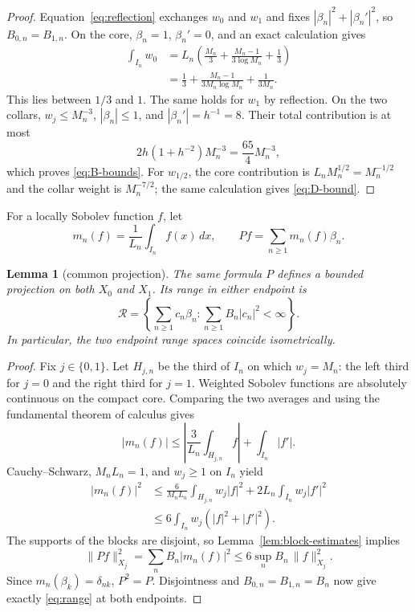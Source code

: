 \documentclass[11pt]{article}
\newtheorem{lemma}[theorem]{Lemma}
\theoremstyle{remark}
\begin{document}
\begin{proof}
Equation~\eqref{eq:reflection} exchanges $w_0$ and $w_1$ and fixes
$|\beta_n|^2+|\beta_n'|^2$, so $B_{0,n}=B_{1,n}$.  On the core,
$\beta_n=1$, $\beta_n'=0$, and an exact calculation gives
\begin{align*}
 \int_{I_n}w_0
 &=L_n\left(\frac{M_n}{3}
      +\frac{M_n-1}{3\log M_n}+\frac13\right)\\
 &=\frac13+\frac{M_n-1}{3M_n\log M_n}+\frac1{3M_n}.
\end{align*}
This lies between $1/3$ and $1$.  The same holds for $w_1$ by reflection.
On the two collars, $w_j\leq M_n^{-3}$, $|\beta_n|\leq1$, and
$|\beta_n'|=h^{-1}=8$.  Their total contribution is at most
\[
 2h(1+h^{-2})M_n^{-3}=\frac{65}{4}M_n^{-3},
\]
which proves \eqref{eq:B-bounds}.  For $w_{1/2}$, the core contribution is
$L_nM_n^{1/2}=M_n^{-1/2}$ and the collar weight is $M_n^{-7/2}$; the same
calculation gives \eqref{eq:D-bound}.
\end{proof}

For a locally Sobolev function $f$, let
\[
 m_n(f)=\frac1{L_n}\int_{I_n}f(x)\,dx,
 \qquad Pf=\sum_{n\geq1}m_n(f)\beta_n.
\]

\begin{lemma}[common projection]\label{lem:projection}
The same formula $P$ defines a bounded projection on both $X_0$ and $X_1$.
Its range in either endpoint is
\begin{equation}\label{eq:range}
 \mathcal R=\left\{\sum_{n\geq1}c_n\beta_n:
             \sum_{n\geq1}B_n|c_n|^2<\infty\right\}.
\end{equation}
In particular, the two endpoint range spaces coincide isometrically.
\end{lemma}

\begin{proof}
Fix $j\in\{0,1\}$.  Let $H_{j,n}$ be the third of $I_n$ on which $w_j=M_n$:
the left third for $j=0$ and the right third for $j=1$.  Weighted Sobolev
functions are absolutely continuous on the compact core.  Comparing the two
averages and using the fundamental theorem of calculus gives
\[
 |m_n(f)|\leq\left|\frac3{L_n}\int_{H_{j,n}}f\right|
              +\int_{I_n}|f'|.
\]
Cauchy--Schwarz, $M_nL_n=1$, and $w_j\geq1$ on $I_n$ yield
\begin{align*}
 |m_n(f)|^2
 &\leq \frac6{M_nL_n}\int_{H_{j,n}}w_j|f|^2
       +2L_n\int_{I_n}w_j|f'|^2\\
 &\leq6\int_{I_n}w_j(|f|^2+|f'|^2).
\end{align*}
The supports of the blocks are disjoint, so Lemma~\ref{lem:block-estimates}
implies
\[
 \|Pf\|_{X_j}^2
 =\sum_nB_n|m_n(f)|^2\leq 6\sup_nB_n\,\|f\|_{X_j}^2.
\]
Since $m_n(\beta_k)=\delta_{nk}$, $P^2=P$.  Disjointness and
$B_{0,n}=B_{1,n}=B_n$ now give exactly \eqref{eq:range} at both endpoints.
\end{proof}
\end{document}
